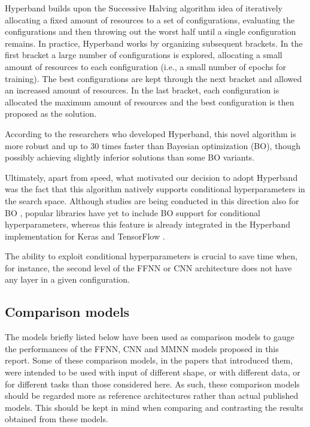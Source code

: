 \documentclass{article}
\begin{document}
Hyperband builds upon the Successive Halving algorithm idea of iteratively allocating a fixed amount of resources to a set of configurations, evaluating the configurations and then throwing out the worst half until a single configuration remains. In practice, Hyperband works by organizing subsequent brackets. In the first bracket a large number of configurations is explored, allocating a small amount of resources to each configuration (i.e., a small number of epochs for training). The best configurations are kept through the next bracket and allowed an increased amount of resources. In the last bracket, each configuration is allocated the maximum amount of resources and the best configuration is then proposed as the solution.

According to the researchers who developed Hyperband, this novel algorithm is more robust and up to 30 times faster than Bayesian optimization (BO), though possibly achieving slightly inferior solutions than some BO variants.

Ultimately, apart from speed, what motivated our decision to adopt Hyperband was the fact that this algorithm natively supports conditional hyperparameters in the search space. Although studies are being conducted in this direction also for BO \cite{levesque17}, popular libraries have yet to include BO support for conditional hyperparameters, whereas this feature is already integrated in the Hyperband implementation for Keras and TensorFlow \cite{kerastuner}.

The ability to exploit conditional hyperparameters is crucial to save time when, for instance, the second level of the FFNN or CNN architecture does not have any layer in a given configuration.

\subsection{Comparison models}
\label{subsec:comparison_models}

The models briefly listed below have been used as comparison models to gauge the performances of the FFNN, CNN and MMNN models proposed in this report. Some of these comparison models, in the papers that introduced them, were intended to be used with input of different shape, or with different data, or for different tasks than those considered here. As such, these comparison models should be regarded more as reference architectures rather than actual published models. This should be kept in mind when comparing and contrasting the results obtained from these models.
\end{document}
